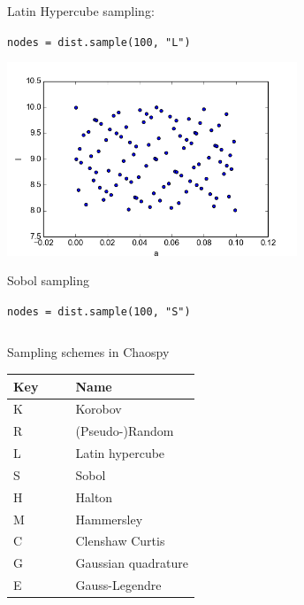 \documentclass[handout]{beamer}
\begin{document}
\begin{frame}[fragile]
\begin{columns}
\begin{center}
                Latin Hypercube sampling:

                \scriptsize
                \verb;nodes = dist.sample(100, "L");
                \normalsize



                \includegraphics[width=0.65\textwidth]{samples_S.png}

                Sobol sampling

                \scriptsize
                \verb;nodes = dist.sample(100, "S");
                \normalsize
     \end{center}
 \end{columns}
\end{frame}


\begin{frame}{Sampling schemes in Chaospy}
\begin{center}
  \begin{tabular}{llll}
   Key & & &  Name            \\\hline
     K & & &  Korobov            \\
     R & & &  (Pseudo-)Random   \\
     L & & &  Latin hypercube    \\
     S & & &  Sobol              \\
     H & & &  Halton             \\
     M & & &  Hammersley        \\\hline
     C & & &  Clenshaw Curtis   \\
     G & & &  Gaussian quadrature\\
     E & & &  Gauss-Legendre\\\hline
  \end{tabular}

\end{center}

\end{frame}
\end{document}
